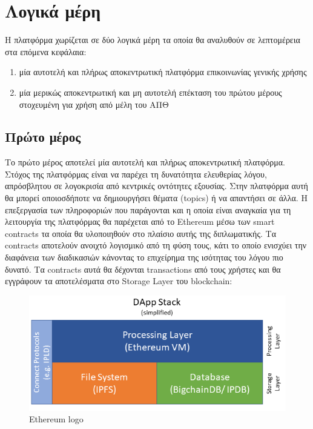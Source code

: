 \section{Λογικά μέρη} \label{section:3-1-logical-parts}

Η πλατφόρμα χωρίζεται σε δύο λογικά μέρη τα οποία θα αναλυθούν σε λεπτομέρεια στα επόμενα κεφάλαια:

\begin{enumerate}
    \item μία αυτοτελή και πλήρως αποκεντρωτική πλατφόρμα επικοινωνίας γενικής χρήσης
    \item μία μερικώς αποκεντρωτική και μη αυτοτελή επέκταση του πρώτου μέρους στοχευμένη για χρήση από μέλη του ΑΠΘ
\end{enumerate}

\subsection{Πρώτο μέρος} \label{subsection:3-1-first-part}

Το πρώτο μέρος αποτελεί μία αυτοτελή και πλήρως αποκεντρωτική πλατφόρμα. Στόχος της πλατφόρμας είναι να παρέχει τη
δυνατότητα ελευθερίας λόγου, απρόσβλητου σε λογοκρισία από κεντρικές οντότητες εξουσίας. Στην πλατφόρμα αυτή θα μπορεί
οποιοσδήποτε να δημιουργήσει θέματα (topics) ή να απαντήσει σε άλλα. Η επεξεργασία των πληροφοριών που παράγονται και η
οποία είναι αναγκαία για τη λειτουργία της πλατφόρμας θα παρέχεται από το Ethereum μέσω των smart contracts τα οποία θα
υλοποιηθούν στο πλαίσιο αυτής της διπλωματικής. Τα contracts αποτελούν ανοιχτό λογισμικό από τη φύση τους, κάτι το οποίο
ενισχύει την διαφάνεια των διαδικασιών κάνοντας το επιχείρημα της ισότητας του λόγου πιο δυνατό. Τα contracts αυτά θα
δέχονται transactions από τους χρήστες και θα εγγράφουν τα αποτελέσματα στο Storage Layer του blockchain:

\begin{figure}[H]
    \centering
    \includegraphics[width=.75\textwidth]{assets/figures/chapter-3/simple_dapp_stack}
    \caption{Ethereum logo}
\end{figure}

